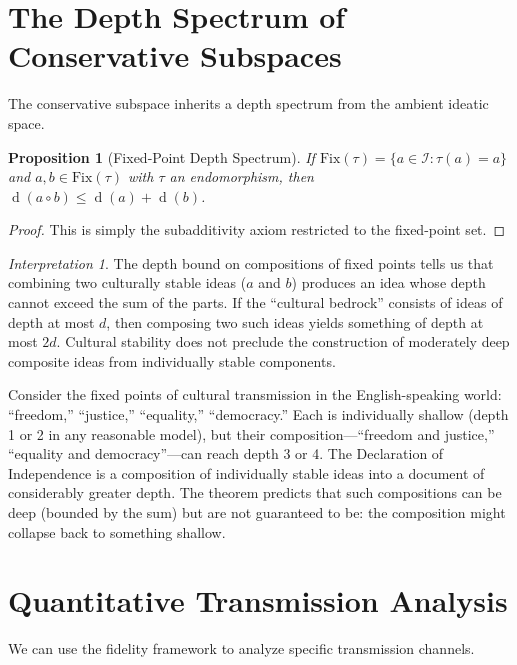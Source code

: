 \documentclass[11pt,openany]{book}
\theoremstyle{definition}
\theoremstyle{plain}
\newtheorem{proposition}[axiom]{Proposition}
\theoremstyle{remark}
\newtheorem{interpretation}[axiom]{Interpretation}
\newcommand{\IS}{\mathcal{I}}               %
\newcommand{\compose}{\circ}                 %
\newcommand{\depth}{\operatorname{d}}       %
\newcommand{\transmit}{\tau}                 %
\begin{document}
\section{The Depth Spectrum of Conservative Subspaces}

The conservative subspace inherits a depth spectrum from the ambient ideatic space.

\begin{proposition}[Fixed-Point Depth Spectrum]
If $\mathrm{Fix}(\transmit) = \{a \in \IS : \transmit(a) = a\}$ and $a, b \in \mathrm{Fix}(\transmit)$ with $\transmit$ an endomorphism, then $\depth(a \compose b) \leq \depth(a) + \depth(b)$.
\end{proposition}

\begin{proof}
This is simply the subadditivity axiom restricted to the fixed-point set.
\end{proof}

\begin{interpretation}
The depth bound on compositions of fixed points tells us that combining two culturally stable ideas ($a$ and $b$) produces an idea whose depth cannot exceed the sum of the parts. If the ``cultural bedrock'' consists of ideas of depth at most $d$, then composing two such ideas yields something of depth at most $2d$. Cultural stability does not preclude the construction of moderately deep composite ideas from individually stable components.

Consider the fixed points of cultural transmission in the English-speaking world: ``freedom,'' ``justice,'' ``equality,'' ``democracy.'' Each is individually shallow (depth 1 or 2 in any reasonable model), but their composition---``freedom and justice,'' ``equality and democracy''---can reach depth 3 or 4. The Declaration of Independence is a composition of individually stable ideas into a document of considerably greater depth. The theorem predicts that such compositions can be deep (bounded by the sum) but are not guaranteed to be: the composition might collapse back to something shallow.
\end{interpretation}

\section{Quantitative Transmission Analysis}

We can use the fidelity framework to analyze specific transmission channels.
\end{document}
